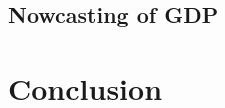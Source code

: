 \documentclass[oneside]{article}
\theoremstyle{plain}%
\theoremstyle{definition}
\newcommand{\ydiff}{D y}
\newcommand{\xdiff}{Dx}
\begin{document}
\subsection{Nowcasting of GDP}

\section{Conclusion}
\medskip
\printbibliography

\appendix

\end{document}
